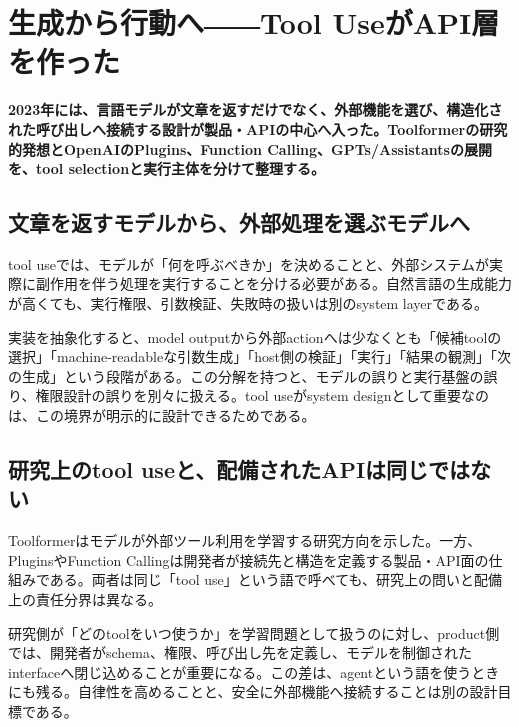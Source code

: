 \section{生成から行動へ――Tool UseがAPI層を作った}
\label{pkg:tool-action-layer}
\noindent\textbf{2023年には、言語モデルが文章を返すだけでなく、外部機能を選び、構造化された呼び出しへ接続する設計が製品・APIの中心へ入った。Toolformerの研究的発想とOpenAIのPlugins、Function Calling、GPTs/Assistantsの展開を、tool selectionと実行主体を分けて整理する。}\autocite{src-150e07b331df,src-4de1cea0a896,src-6b76b870b4ae,src-97786632d087,src-e17d0bf10781}

\subsection{文章を返すモデルから、外部処理を選ぶモデルへ}

tool useでは、モデルが「何を呼ぶべきか」を決めることと、外部システムが実際に副作用を伴う処理を実行することを分ける必要がある。自然言語の生成能力が高くても、実行権限、引数検証、失敗時の扱いは別のsystem layerである。\autocite{src-150e07b331df,src-4de1cea0a896,src-6b76b870b4ae,src-97786632d087,src-e17d0bf10781}


実装を抽象化すると、model outputから外部actionへは少なくとも「候補toolの選択」「machine-readableな引数生成」「host側の検証」「実行」「結果の観測」「次の生成」という段階がある。この分解を持つと、モデルの誤りと実行基盤の誤り、権限設計の誤りを別々に扱える。tool useがsystem designとして重要なのは、この境界が明示的に設計できるためである。\autocite{src-150e07b331df,src-4de1cea0a896,src-6b76b870b4ae,src-97786632d087,src-e17d0bf10781}


\subsection{研究上のtool useと、配備されたAPIは同じではない}

Toolformerはモデルが外部ツール利用を学習する研究方向を示した。一方、PluginsやFunction Callingは開発者が接続先と構造を定義する製品・API面の仕組みである。両者は同じ「tool use」という語で呼べても、研究上の問いと配備上の責任分界は異なる。\autocite{src-150e07b331df,src-4de1cea0a896,src-6b76b870b4ae,src-97786632d087,src-e17d0bf10781}


研究側が「どのtoolをいつ使うか」を学習問題として扱うのに対し、product側では、開発者がschema、権限、呼び出し先を定義し、モデルを制御されたinterfaceへ閉じ込めることが重要になる。この差は、agentという語を使うときにも残る。自律性を高めることと、安全に外部機能へ接続することは別の設計目標である。\autocite{src-150e07b331df,src-4de1cea0a896,src-6b76b870b4ae,src-97786632d087,src-e17d0bf10781}


